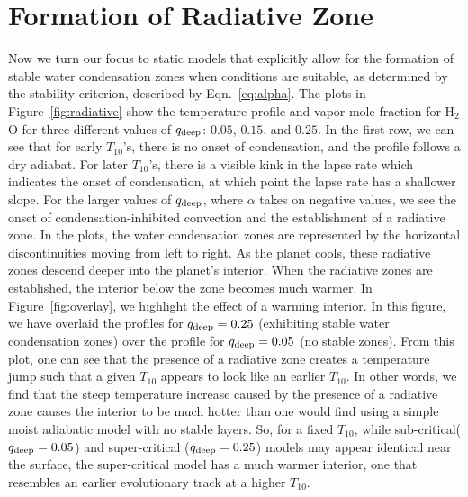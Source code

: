 \documentclass[11pt]{ucscthesisbs}
\begin{document}
\section{Formation of Radiative Zone}
Now we turn our focus to static models that explicitly allow for the formation of stable water condensation zones when conditions are suitable, as determined by the stability criterion, described by Eqn.~\ref{eq:alpha}. The plots in Figure~\ref{fig:radiative} show the temperature profile and vapor mole fraction for H$_{2}$O for three different values of $q_{\rm deep}$: $0.05$, $0.15$, and $0.25$. In the first row, we can see that for early $T_{10}$'s, there is no onset of condensation, and the profile follows a dry adiabat. For later $T_{10}$'s, there is a visible kink in the lapse rate which indicates the onset of condensation, at which point the lapse rate has a shallower slope. For the larger values of $q_{\rm deep}$, where $\alpha$ takes on negative values, we see the onset of condensation-inhibited convection and the establishment of a radiative zone. In the plots, the water condensation zones are represented by the horizontal discontinuities moving from left to right. As the planet cools, these radiative zones descend deeper into the planet's interior. When the radiative zones are established, the interior below the zone becomes much warmer. In Figure~\ref{fig:overlay}, we highlight the effect of a warming interior. In this figure, we have overlaid the profiles for $q_{\rm deep} = 0.25$ (exhibiting stable water condensation zones) over the profile for $q_{\rm deep}=0.05$ (no stable zones). From this plot, one can see that the presence of a radiative zone creates a temperature jump such that a given $T_{10}$ appears to look like an earlier $T_{10}$. In other words, we find that the steep temperature increase caused by the presence of a radiative zone causes the interior to be much hotter than one would find using a simple moist adiabatic model with no stable layers. So, for a fixed $T_{10}$, while sub-critical($q_{\rm deep} = 0.05$) and super-critical ($q_{\rm deep} = 0.25$) models may appear identical near the surface, the super-critical model has a much warmer interior, one that resembles an earlier evolutionary track at a higher $T_{10}$.
\end{document}
